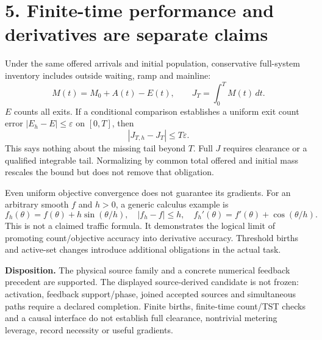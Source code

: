 \documentclass[11pt,a4paper]{article}
\begin{document}
\newpage
\section*{5. Finite-time performance and derivatives are separate claims}
Under the same offered arrivals and initial population, conservative
full-system inventory includes outside waiting, ramp and mainline:
\begin{equation}
 M(t)=M_0+A(t)-E(t),\qquad
 J_T=\int_0^T M(t)\,dt.
\end{equation}
$E$ counts all exits. If a conditional comparison establishes a uniform exit
count error $|E_h-E|\le\varepsilon$ on $[0,T]$, then
\begin{equation}
 |J_{T,h}-J_T|\le T\varepsilon.
\end{equation}
This says nothing about the missing tail beyond $T$. Full $J$ requires
clearance or a qualified integrable tail. Normalizing by common total offered
and initial mass rescales the bound but does not remove that obligation.

Even uniform objective convergence does not guarantee its gradients. For
an arbitrary smooth $f$ and $h>0$, a generic calculus example is
\begin{equation}
 f_h(\theta)=f(\theta)+h\sin(\theta/h),\quad
 |f_h-f|\le h,\quad
 f_h'(\theta)=f'(\theta)+\cos(\theta/h).
\end{equation}
This is not a claimed traffic formula. It demonstrates the logical limit of
promoting count/objective accuracy into derivative accuracy. Threshold births
and active-set changes introduce additional obligations in the actual task.

\textbf{Disposition.} The physical source family and a concrete numerical
feedback precedent are supported. The displayed source-derived candidate is
not frozen: activation, feedback support/phase, joined accepted sources and
simultaneous paths require a declared completion. Finite births, finite-time
count/TST checks and a causal interface do not establish full clearance,
nontrivial metering leverage, record necessity or useful gradients.
\end{document}
